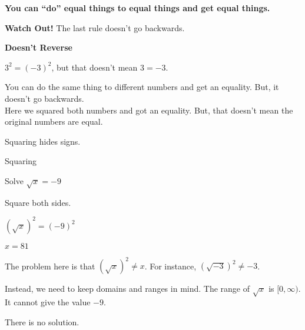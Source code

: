 \documentclass{ximera}
\begin{document}
\begin{center}


\textbf{\textcolor{purple!85!blue}{You can ``do'' equal things to equal things and get equal things.}}


\end{center}



\textbf{\textcolor{red!70!black}{Watch Out!}} The last rule doesn't go backwards.




\begin{warning}  \textbf{\textcolor{red!70!black}{Doesn't Reverse}}  



$3^2 = (-3)^2$, but that doesn't mean $3=-3$.


You can do the same thing to different numbers and get an equality.  But, it doesn't go backwards.  \\

Here we squared both numbers and got an equality.  But, that doesn't mean the original numbers are equal.


\end{warning}



Squaring hides signs.


\begin{example} Squaring


Solve $\sqrt{x} = -9$

\begin{explanation}

Square both sides.


$(\sqrt{x})^2 = (-9)^2$

$x = 81$



The problem here is that  $(\sqrt{x})^2 \ne x$.  For instance, $(\sqrt{-3})^2 \ne -3$.


Instead, we need to keep domains and ranges in mind.  The range of $\sqrt{x}$ is $[0, \infty)$. It cannot give the value $-9$.


There is no solution.


\end{explanation}

\end{example}
\end{document}
